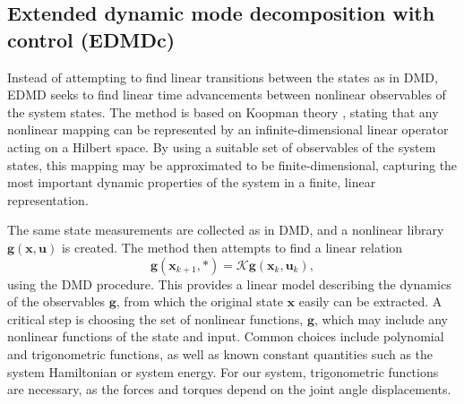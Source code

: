 \documentclass[../main.tex]{subfiles}
\begin{document}

\subsection{Extended dynamic mode decomposition with control \mbox{(EDMDc)}}

Instead of attempting to find linear transitions between the states as in DMD, EDMD \cite{williams2015} seeks to find linear time advancements between nonlinear observables of the system states. The method is based on Koopman theory \cite{budisic2012}, stating that any nonlinear mapping can be represented by an infinite-dimensional linear operator acting on a Hilbert space. By using a suitable set of observables of the system states, this mapping may be approximated to be finite-dimensional, capturing the most important dynamic properties of the system in a finite, linear representation.

The same state measurements are collected as in DMD, and a nonlinear library $\bm{g}(\bm{x}, \bm{u})$ is created. The method then attempts to find a linear relation
\begin{equation}
    \label{eq:koopman_relation}
    \bm{g}(\bm{x}_{k+1}, *) = \mathcal{K} \bm{g}(\bm{x}_{k}, \bm{u}_k),
\end{equation}
using the DMD procedure. This provides a linear model describing the dynamics of the observables $\bm{g}$, from which the original state $\bm{x}$ easily can be extracted. A critical step is choosing the set of nonlinear functions, $\bm{g}$, which may include any nonlinear functions of the state and input. Common choices include polynomial and trigonometric functions, as well as known constant quantities such as the system Hamiltonian or system energy. For our system, trigonometric functions are necessary, as the forces and torques depend on the joint angle displacements.
\end{document}
